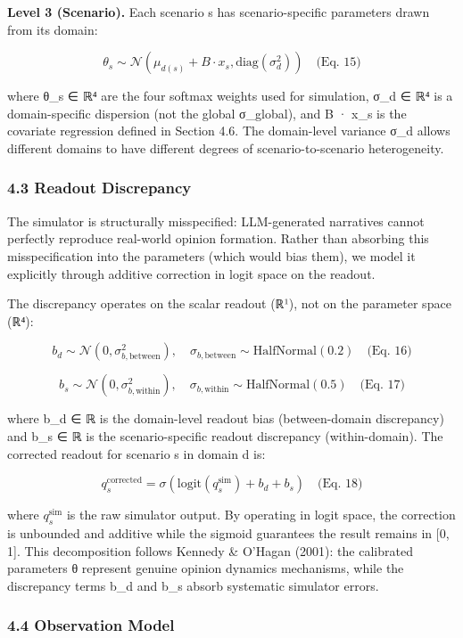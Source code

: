\documentclass[
]{article}
\begin{document}
\textbf{Level 3 (Scenario).} Each scenario s has scenario-specific
parameters drawn from its domain:

\[\theta_s \sim \mathcal{N}(\mu_{d(s)} + B \cdot x_s, \text{diag}(\sigma_d^2)) \quad \text{(Eq. 15)}\]

where θ\_s ∈ ℝ⁴ are the four softmax weights used for simulation, σ\_d ∈
ℝ⁴ is a domain-specific dispersion (not the global σ\_global), and B ·
x\_s is the covariate regression defined in Section 4.6. The
domain-level variance σ\_d allows different domains to have different
degrees of scenario-to-scenario heterogeneity.

\subsubsection{4.3 Readout Discrepancy}\label{readout-discrepancy}

The simulator is structurally misspecified: LLM-generated narratives
cannot perfectly reproduce real-world opinion formation. Rather than
absorbing this misspecification into the parameters (which would bias
them), we model it explicitly through additive correction in logit space
on the readout.

The discrepancy operates on the scalar readout (ℝ¹), not on the
parameter space (ℝ⁴):

\[b_d \sim \mathcal{N}(0, \sigma_{b,\text{between}}^2), \quad \sigma_{b,\text{between}} \sim \text{HalfNormal}(0.2) \quad \text{(Eq. 16)}\]

\[b_s \sim \mathcal{N}(0, \sigma_{b,\text{within}}^2), \quad \sigma_{b,\text{within}} \sim \text{HalfNormal}(0.5) \quad \text{(Eq. 17)}\]

where b\_d ∈ ℝ is the domain-level readout bias (between-domain
discrepancy) and b\_s ∈ ℝ is the scenario-specific readout discrepancy
(within-domain). The corrected readout for scenario s in domain d is:

\[q_s^{\text{corrected}} = \sigma\left(\text{logit}(q_s^{\text{sim}}) + b_d + b_s\right) \quad \text{(Eq. 18)}\]

where \(q_s^{\text{sim}}\) is the raw simulator output. By operating in
logit space, the correction is unbounded and additive while the sigmoid
guarantees the result remains in {[}0, 1{]}. This decomposition follows
Kennedy \& O'Hagan (2001): the calibrated parameters θ represent genuine
opinion dynamics mechanisms, while the discrepancy terms b\_d and b\_s
absorb systematic simulator errors.

\subsubsection{4.4 Observation Model}\label{observation-model}
\end{document}
